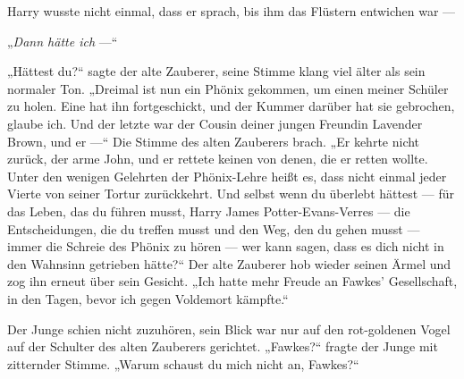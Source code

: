 Harry wusste nicht einmal, dass er sprach, bis ihm das Flüstern entwichen war —


„\emph{Dann hätte ich} —“

„Hättest du?“ sagte der alte Zauberer, seine Stimme klang viel älter als sein normaler Ton.
„Dreimal ist nun ein Phönix gekommen, um einen meiner Schüler zu holen. Eine hat ihn fortgeschickt, und der Kummer darüber hat sie gebrochen, glaube ich. Und der letzte war der Cousin deiner jungen Freundin Lavender Brown, und er —“
Die Stimme des alten Zauberers brach.
„Er kehrte nicht zurück, der arme John, und er rettete keinen von denen, die er retten wollte. Unter den wenigen Gelehrten der Phönix-Lehre heißt es, dass nicht einmal jeder Vierte von seiner Tortur zurückkehrt. Und selbst wenn du überlebt hättest — für das Leben, das du führen musst, Harry James Potter-Evans-Verres — die Entscheidungen, die du treffen musst und den Weg, den du gehen musst — immer die Schreie des Phönix zu hören — wer kann sagen, dass es dich nicht in den Wahnsinn getrieben hätte?“
Der alte Zauberer hob wieder seinen Ärmel und zog ihn erneut über sein Gesicht.
„Ich hatte mehr Freude an Fawkes’ Gesellschaft, in den Tagen, bevor ich gegen Voldemort kämpfte.“

Der Junge schien nicht zuzuhören, sein Blick war nur auf den rot-goldenen Vogel auf der Schulter des alten Zauberers gerichtet.
„Fawkes?“ fragte der Junge mit zitternder Stimme.
„Warum schaust du mich nicht an, Fawkes?“


